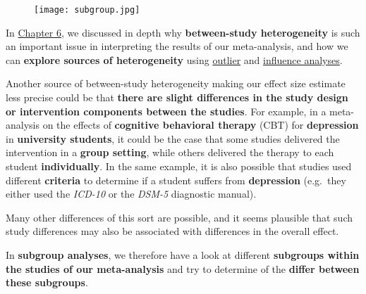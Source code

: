 \documentclass[]{book}
\theoremstyle{definition}
\theoremstyle{definition}
\theoremstyle{definition}
\theoremstyle{remark}
\begin{document}
\begin{figure}
\centering
\texttt{[image: subgroup.jpg]}
\caption{}
\end{figure}

In \protect\hyperlink{heterogeneity}{Chapter 6}, we discussed in depth
why \textbf{between-study heterogeneity} is such an important issue in
interpreting the results of our meta-analysis, and how we can
\textbf{explore sources of heterogeneity} using
\protect\hyperlink{outliers}{outlier} and
\protect\hyperlink{influenceanalyses}{influence analyses}.

Another source of between-study heterogeneity making our effect size
estimate less precise could be that \textbf{there are slight differences
in the study design or intervention components between the studies}. For
example, in a meta-analysis on the effects of \textbf{cognitive
behavioral therapy} (CBT) for \textbf{depression} in \textbf{university
students}, it could be the case that some studies delivered the
intervention in a \textbf{group setting}, while others delivered the
therapy to each student \textbf{individually}. In the same example, it
is also possible that studies used different \textbf{criteria} to
determine if a student suffers from \textbf{depression} (e.g.~they
either used the \emph{ICD-10} or the \emph{DSM-5} diagnostic manual).

Many other differences of this sort are possible, and it seems plausible
that such study differences may also be associated with differences in
the overall effect.

In \textbf{subgroup analyses}, we therefore have a look at different
\textbf{subgroups within the studies of our meta-analysis} and try to
determine of the \textbf{differ between these subgroups}.
\end{document}
